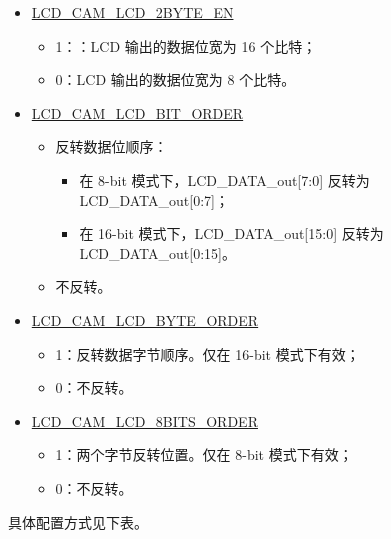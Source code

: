 \documentclass[main\_\_CN.tex]{subfiles}
\begin{document}
\begin{itemize}
    \item \hyperref[fielddesc:LCDCAMLCD2BYTEEN]{LCD\_CAM\_LCD\_2BYTE\_EN}
    \begin{itemize}
        \item 1：：LCD 输出的数据位宽为 16 个比特；
        \item 0：LCD 输出的数据位宽为 8 个比特。
    \end{itemize}
    \item \hyperref[fielddesc:LCDCAMLCDBITORDER]{LCD\_CAM\_LCD\_BIT\_ORDER}
    \begin{itemize}
        \item 反转数据位顺序：
        \begin{itemize}
            \item 在 8-bit 模式下，LCD\_DATA\_out[7:0] 反转为 LCD\_DATA\_out[0:7]；
            \item 在 16-bit 模式下，LCD\_DATA\_out[15:0] 反转为 LCD\_DATA\_out[0:15]。
        \end{itemize}
        \item 不反转。
    \end{itemize}
    \item \hyperref[fielddesc:LCDCAMLCDBYTEORDER]{LCD\_CAM\_LCD\_BYTE\_ORDER}
    \begin{itemize}
        \item 1：反转数据字节顺序。仅在 16-bit 模式下有效；
        \item 0：不反转。
    \end{itemize}
    \item \hyperref[fielddesc:LCDCAMLCD8BITSORDER]{LCD\_CAM\_LCD\_8BITS\_ORDER}
    \begin{itemize}
        \item 1：两个字节反转位置。仅在 8-bit 模式下有效；
        \item 0：不反转。
    \end{itemize}
\end{itemize}

具体配置方式见下表。
\end{document}
